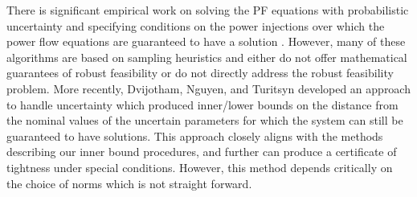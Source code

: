 There is significant empirical work on solving the PF equations with probabilistic uncertainty \cite{morales2007point,wang1992interval} and specifying conditions on the power injections over which the power flow equations are guaranteed to have a solution \cite{bolognani2016existence,EPFLA,EPFLB}.
However, many of these algorithms are based on sampling heuristics and either do not offer mathematical guarantees of robust feasibility or do not directly address the robust feasibility problem.
More recently, Dvijotham, Nguyen, and Turitsyn \cite{DjTuritsyn} developed an approach to handle uncertainty which produced inner/lower bounds on the distance from the nominal values of the uncertain parameters for which the system can still be guaranteed to have solutions.
This approach closely aligns with the methods describing our inner bound procedures, and further can produce a certificate of tightness under special conditions. 
However, this method depends critically on the choice of norms which is not straight forward.
